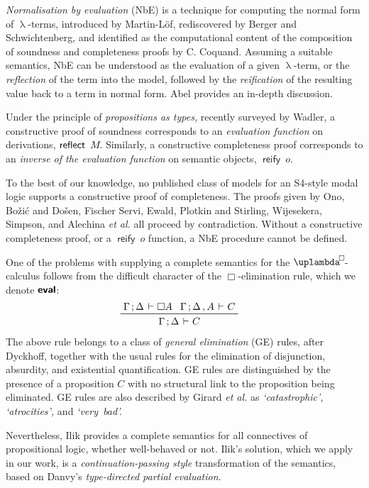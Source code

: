 \documentclass[submission,copyright,creativecommons,sharealike,backref=page]{eptcs}
\newcommand{\uplambdabox}{\uplambda^{\mkern-3mu\Box\mkern-3mu}}
\renewcommand{\:}{\mathop{\mkern3mu:\mkern3mu}}
\renewcommand{\.}{\mathop{\mkern3mu.\mkern3mu}}
\renewcommand{\;}{\mathop{;}}
\renewcommand{\,}{\mathop{,}}
\newcommand{\e}{\mathrel{\mkern2mu\vdash\mkern1mu}}
\newcommand{\reflect}{\operatorname{\textsf{reflect}}}
\newcommand{\reify}{\operatorname{\textsf{reify}}}
\newcommand{\eval}{\operatorname{\textsf{\textbf{eval}}}}
\theoremstyle{mystyle}
\begin{document}
\emph{Normalisation by evaluation} (NbE) is a technique for computing the normal form of $\uplambda$-terms, introduced by Martin-L{\"o}f\cite{MartinLof75}, rediscovered by Berger and Schwichtenberg\cite{BergerS91}, and identified as the computational content of the composition of soundness and completeness proofs by C. Coquand\cite{Coquand93}.  Assuming a suitable semantics, NbE can be understood as the evaluation of a given $\uplambda$-term, or the \emph{reflection} of the term into the model, followed by the \emph{reification} of the resulting value back to a term in normal form.  Abel\cite{Abel13} provides an in-depth discussion.

Under the principle of \emph{propositions as types,} recently surveyed by Wadler\cite{Wadler15}, a constructive proof of soundness corresponds to an \emph{evaluation function} on derivations, $\reflect~M\mkern-3mu$.  Similarly, a constructive completeness proof corresponds to an \emph{inverse of the evaluation function} on semantic objects, $\reify~o$.

To the best of our knowledge, no published class of models for an S4-style modal logic supports a constructive proof of completeness.  The proofs given by Ono\cite{Ono77}, Bo\v{z}i\'{c} and Do\v{s}en\cite{BozicD84}, Fischer Servi\cite{FischerServi84}, Ewald\cite{Ewald86}, Plotkin and Stirling\cite{PlotkinS86}, Wijesekera\cite{Wijesekera90}, Simpson\cite{Simpson94}, and Alechina \emph{et al.}\cite{AlechinaMPR01} all proceed by contradiction.  Without a constructive completeness proof, or a $\reify~o$ function, a NbE procedure cannot be defined.

One of the problems with supplying a complete semantics for the $\uplambdabox$-calculus follows from the difficult character of the $\Box$-elimination rule, which we denote $\eval$:
\begin{align*}
  & \prftree
     {\Gamma \; \Delta \e \Box A}{\Gamma \; \Delta \, A \e C}
     {\Gamma \; \Delta \e C}
\end{align*}
The above rule belongs to a class of \emph{general elimination} (GE) rules, after Dyckhoff\cite{Dyckhoff16}, together with the usual rules for the elimination of disjunction, absurdity, and existential quantification.  GE rules are distinguished by the presence of a proposition $C$ with no structural link to the proposition being eliminated.  GE rules are also described by Girard \emph{et al.}\cite{GirardTL89} as \textsl{`catastrophic', `atrocities',} and \textsl{`very~bad'.}

Nevertheless, Ilik\cite{Ilik13} provides a complete semantics for all connectives of propositional logic, whether well-behaved or not.  Ilik's solution, which we apply in our work, is a \emph{continuation-passing style} transformation of the semantics, based on Danvy's\cite{Danvy96} \emph{type-directed partial evaluation.}
\end{document}
